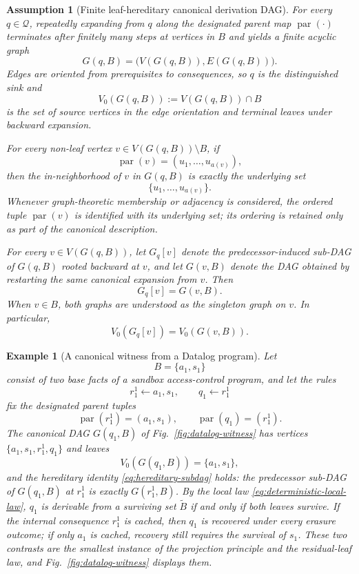 \documentclass[journal]{IEEEtran}
\newtheorem{assumption}{Assumption}[section]
\newtheorem{example}{Example}[section]
\numberwithin{equation}{section}
\begin{document}
\begin{assumption}[Finite leaf-hereditary canonical derivation DAG]
\label{assump:hereditary-dag}
For every \(q\in\mathcal Q\), repeatedly expanding from \(q\) along the
designated parent map \(\operatorname{par}(\cdot)\) terminates after finitely
many steps at vertices in \(B\) and yields a finite acyclic graph
\[
  G(q,B)=\bigl(V(G(q,B)),E(G(q,B))\bigr).
\]
Edges are oriented from prerequisites to consequences, so \(q\) is the
distinguished sink and
\[
  V_0(G(q,B))
  :=
  V(G(q,B))\cap B
\]
is the set of source vertices in the edge orientation and terminal leaves
under backward expansion.

For every non-leaf vertex
\(v\in V(G(q,B))\setminus B\), if
\[
  \operatorname{par}(v)=(u_1,\ldots,u_{a(v)}),
\]
then the in-neighborhood of \(v\) in \(G(q,B)\) is exactly the underlying set
\[
  \{u_1,\ldots,u_{a(v)}\}.
\]
Whenever graph-theoretic membership or adjacency is considered, the ordered
tuple \(\operatorname{par}(v)\) is identified with its underlying set; its
ordering is retained only as part of the canonical description.

For every \(v\in V(G(q,B))\), let \(G_q[v]\) denote the predecessor-induced
sub-DAG of \(G(q,B)\) rooted backward at \(v\), and let \(G(v,B)\) denote the
DAG obtained by restarting the same canonical expansion from \(v\).  Then
\begin{equation}
  G_q[v]=G(v,B).
\label{eq:hereditary-subdag}
\end{equation}
When \(v\in B\), both graphs are understood as the singleton graph on \(v\).
In particular,
\begin{equation}
  V_0(G_q[v])=V_0(G(v,B)).
\label{eq:hereditary-leaves}
\end{equation}
\end{assumption}

\begin{example}[A canonical witness from a Datalog program]
\label{ex:minimal-canonical}
Let
\[
  B=\{a_{1},s_{1}\}
\]
consist of two base facts of a sandbox access-control program, and let the
rules
\[
  r_{1}^{1}\leftarrow a_{1},s_{1},
  \qquad
  q_{1}\leftarrow r_{1}^{1}
\]
fix the designated parent tuples
\[
  \operatorname{par}(r_{1}^{1})=(a_{1},s_{1}),
  \qquad
  \operatorname{par}(q_{1})=(r_{1}^{1}).
\]
The canonical DAG \(G(q_{1},B)\) of Fig.~\ref{fig:datalog-witness} has vertices
\(\{a_{1},s_{1},r_{1}^{1},q_{1}\}\) and leaves
\[
  V_{0}(G(q_{1},B))=\{a_{1},s_{1}\},
\]
and the hereditary identity \eqref{eq:hereditary-subdag} holds: the
predecessor sub-DAG of \(G(q_{1},B)\) at \(r_{1}^{1}\) is exactly
\(G(r_{1}^{1},B)\).  By the local law \eqref{eq:deterministic-local-law},
\(q_{1}\) is derivable from a surviving set \(\widetilde B\) if and only if
both leaves survive.  If the internal consequence \(r_{1}^{1}\) is cached,
then \(q_{1}\) is recovered under every erasure outcome; if only \(a_{1}\)
is cached, recovery still requires the survival of \(s_{1}\).  These two
contrasts are the smallest instance of the projection principle and the
residual-leaf law, and Fig.~\ref{fig:datalog-witness} displays them.
\end{example}
\end{document}

